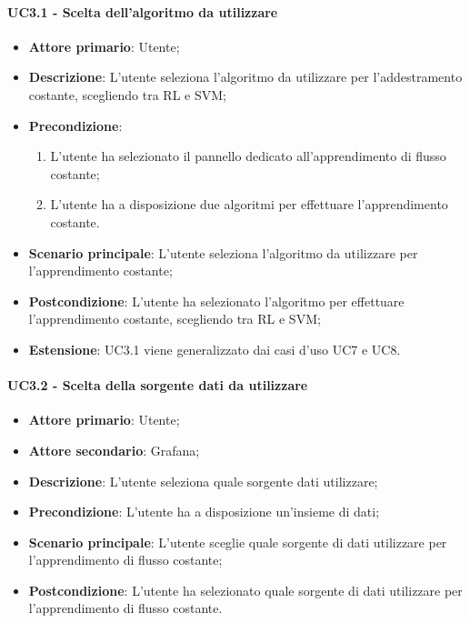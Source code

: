 \paragraph{UC3.1 - Scelta dell'algoritmo da utilizzare}
\label{para:uc3.1}
\begin{itemize}
  \item \textbf{Attore primario}: Utente;
  \item \textbf{Descrizione}: L'utente seleziona l'algoritmo da utilizzare per l'addestramento costante, scegliendo tra RL e SVM;
  \item \textbf{Precondizione}:
  \begin{enumerate}
    \item L'utente ha selezionato il pannello dedicato all'apprendimento di flusso costante;
    \item L'utente ha a disposizione due algoritmi per effettuare l'apprendimento costante.
  \end{enumerate}
  \item \textbf{Scenario principale}: L'utente seleziona l'algoritmo da utilizzare per l'apprendimento costante;
  \item \textbf{Postcondizione}: L'utente ha selezionato l'algoritmo per effettuare l'apprendimento costante, scegliendo tra RL e SVM;
  \item \textbf{Estensione}: UC3.1 viene generalizzato dai casi d'uso UC7 e UC8.
\end{itemize}

\paragraph{UC3.2 - Scelta della sorgente dati da utilizzare}
\label{para:uc3.2}
\begin{itemize}
  \item \textbf{Attore primario}: Utente;
  \item \textbf{Attore secondario}: Grafana;
  \item \textbf{Descrizione}: L'utente seleziona quale sorgente dati utilizzare;
  \item \textbf{Precondizione}: L'utente ha a disposizione un'insieme di dati;
  \item \textbf{Scenario principale}: L'utente sceglie quale sorgente di dati utilizzare per l'apprendimento di flusso costante;
  \item \textbf{Postcondizione}: L'utente ha selezionato quale sorgente di dati utilizzare per l'apprendimento di flusso costante.
\end{itemize}


